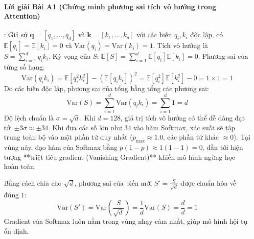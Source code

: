 \paragraph{Lời giải Bài A1 (Chứng minh phương sai tích vô hướng trong Attention)}:
Giả sử $\mathbf{q} = [q_1, \dots, q_d]$ và $\mathbf{k} = [k_1, \dots, k_d]$ với các biến $q_i, k_i$ độc lập, có $\mathbb{E}[q_i] = \mathbb{E}[k_i] = 0$ và $\text{Var}(q_i) = \text{Var}(k_i) = 1$.
Tích vô hướng là $S = \sum_{i=1}^d q_i k_i$.
Kỳ vọng của $S$: $\mathbb{E}[S] = \sum_{i=1}^d \mathbb{E}[q_i]\mathbb{E}[k_i] = 0$.
Phương sai của từng số hạng:
\begin{equation*}
\text{Var}(q_i k_i) = \mathbb{E}[q_i^2 k_i^2] - (\mathbb{E}[q_i k_i])^2 = \mathbb{E}[q_i^2]\mathbb{E}[k_i^2] - 0 = 1 \times 1 = 1
\end{equation*}
Do các biến độc lập, phương sai của tổng bằng tổng các phương sai:
\begin{equation*}
\text{Var}(S) = \sum_{i=1}^d \text{Var}(q_i k_i) = \sum_{i=1}^d 1 = d
\end{equation*}
Độ lệch chuẩn là $\sigma = \sqrt{d}$.
Khi $d = 128$, giá trị tích vô hướng có thể dễ dàng đạt tới $\pm 3\sigma \approx \pm 34$. Khi đưa các số lớn như $34$ vào hàm Softmax, xác suất sẽ tập trung toàn bộ vào một phần tử duy nhất ($p_{\max} \approx 1.0$, các phần tử khác $\approx 0$). Tại vùng này, đạo hàm của Softmax bằng $p(1 - p) \approx 1(1 - 1) = 0$, dẫn tới hiện tượng **triệt tiêu gradient (Vanishing Gradient)** khiến mô hình ngừng học hoàn toàn. 

Bằng cách chia cho $\sqrt{d}$, phương sai của biến mới $S' = \frac{S}{\sqrt{d}}$ được chuẩn hóa về đúng $1$:
\begin{equation*}
\text{Var}(S') = \text{Var}\left(\frac{S}{\sqrt{d}}\right) = \frac{1}{d} \text{Var}(S) = \frac{d}{d} = 1
\end{equation*}
Gradient của Softmax luôn nằm trong vùng nhạy cảm nhất, giúp mô hình hội tụ ổn định.

